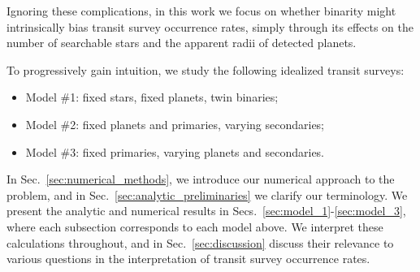 Ignoring these complications, in this work we focus on whether
binarity might intrinsically bias transit survey occurrence rates, simply 
through its effects on the number of searchable stars and the apparent radii 
of detected planets.

To progressively gain intuition, we study the following idealized transit 
surveys:
\begin{itemize}
    \item Model \#1: fixed stars, fixed planets, twin binaries;
    \item Model \#2: fixed planets and primaries, varying secondaries;
    \item Model \#3: fixed primaries, varying planets and secondaries.
\end{itemize}
In Sec.~\ref{sec:numerical_methods}, we introduce our numerical approach 
to the problem, and in Sec.~\ref{sec:analytic_preliminaries} we clarify our 
terminology.
We present the analytic and numerical results in 
Secs.~\ref{sec:model_1}-\ref{sec:model_3}, where each subsection corresponds 
to each model above.
We interpret these calculations throughout, and in 
Sec.~\ref{sec:discussion} discuss their relevance to various questions in 
the interpretation of transit survey occurrence rates. 